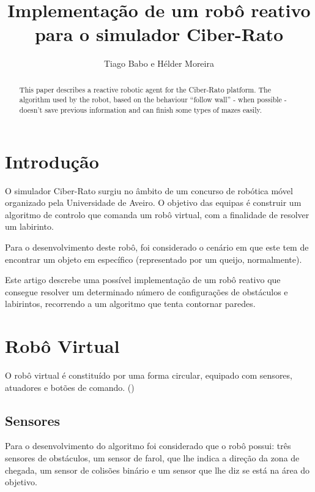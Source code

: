 \documentclass[citeauthoryear]{llncs} %
\begin{document}
\title{Implementação de um robô reativo para o simulador Ciber-Rato}
\author{Tiago Babo e Hélder Moreira}


\maketitle

\begin{abstract}
This paper describes a reactive robotic agent for the Ciber-Rato platform. The algorithm used by the robot, based on the behaviour “follow wall” - when possible - doesn't save previous information and can finish some types of mazes easily.
\end{abstract}

\section{Introdução}
O simulador Ciber-Rato surgiu no âmbito de um concurso de robótica móvel organizado pela Universidade de Aveiro. O objetivo das equipas é construir um algoritmo de controlo que comanda um robô virtual, com a finalidade de resolver um labirinto. 

Para o desenvolvimento deste robô, foi considerado o cenário em que este tem de encontrar um objeto em específico (representado por um queijo, normalmente).

Este artigo descrebe uma possível implementação de um robô reativo que consegue resolver um determinado número de configurações de obstáculos e labirintos, recorrendo a um algoritmo que tenta contornar paredes. 

\section{Robô Virtual}

O robô virtual é constituído por uma forma circular, equipado com sensores, atuadores e botões de comando. (\cite{microrato})

\subsection{Sensores}
Para o desenvolvimento do algoritmo foi considerado que o robô possui: três sensores de obstáculos, um sensor de farol, que lhe indica a direção da zona de chegada, um sensor de colisões binário e um sensor que lhe diz se está na área do objetivo. 
\end{document}
